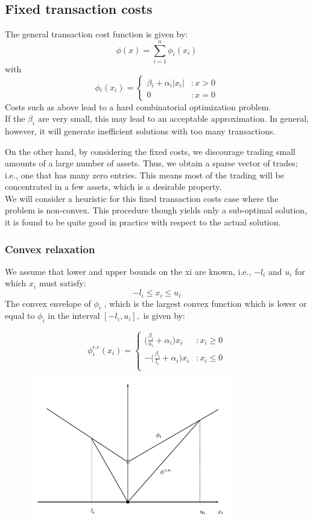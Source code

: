 \documentclass[a4paper]{article}
\begin{document}
\subsection{Fixed transaction costs}

The general transaction cost function is given by:
$$
\phi(x)= \sum_{i=1}^n \phi_i(x_i)
$$
with
\textsc{\[
 \phi_i(x_i) =
  \begin{cases}
   \beta_i + \alpha_i |x_i| & :  x > 0 \\
    0 &: x=0
  \end{cases}
\]
}
Costs such as above lead to a hard combinatorial optimization problem.\\

If the $\beta_i$ are very small, this may lead to an acceptable approximation. In general, however, it will generate inefficient solutions with too many transactions.\cite{2}

On the other hand, by considering the fixed costs, we discourage trading small amounts
of a large number of assets. Thus, we obtain a sparse vector of trades; i.e., one that has many
zero entries. This means most of the trading will be concentrated in a few assets, which is a
desirable property.\\[0.2em]

We will consider a heuristic for this fixed transaction costs case where the problem is non-convex. This procedure though yields only a sub-optimal solution, it is found to be quite good in practice with respect to the actual solution.

\subsubsection{Convex relaxation}

We assume that lower and upper bounds on the xi are known, i.e., $-l_i$ and $u_i$ for which $x_i$ must
satisfy:
$$
-l_i \leq x_i \leq u_i
$$
The convex
envelope of $\phi_i$ , which is the largest convex function which is lower or equal to $\phi_i$ in the interval
$[−l_i, u_i ],$ is given by:

\[
 \phi_i^{c.e}(x_i) =
  \begin{cases}
   \big(\frac{\beta_i}{u_i} + \alpha_i \big) x_i & :  x_i \geq  0 \\
    - \big(\frac{\beta_i}{l_i} + \alpha_i \big) x_i & :  x_i \leq 0 \\
  \end{cases}
\]
\begin{figure}[h]
\centering
\includegraphics[width = 3.5in]{convex.png}
\end{figure}
\end{document}
